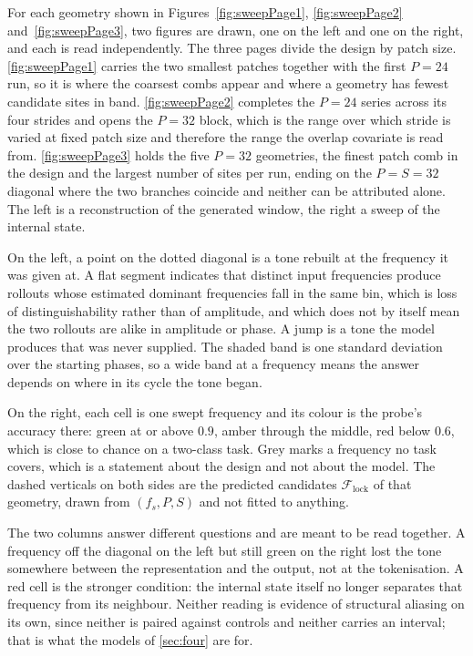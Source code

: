 For each geometry shown in Figures~\ref{fig:sweepPage1}, \ref{fig:sweepPage2} and~\ref{fig:sweepPage3}, two figures are drawn, one on the left and one on the right, and each is read independently. The three pages divide the design by patch size. \autoref{fig:sweepPage1} carries the two smallest patches together with the first $P=24$ run, so it is where the coarsest combs appear and where a geometry has fewest candidate sites in band. \autoref{fig:sweepPage2} completes the $P=24$ series across its four strides and opens the $P=32$ block, which is the range over which stride is varied at fixed patch size and therefore the range the overlap covariate is read from. \autoref{fig:sweepPage3} holds the five $P=32$ geometries, the finest patch comb in the design and the largest number of sites per run, ending on the $P=S=32$ diagonal where the two branches coincide and neither can be attributed alone. The left is a reconstruction of the generated window, the right a sweep of the internal state.

On the left, a point on the dotted diagonal is a tone rebuilt at the frequency it was given at. A flat segment indicates that distinct input frequencies produce rollouts whose estimated dominant frequencies fall in the same bin, which is loss of distinguishability rather than of amplitude, and which does not by itself mean the two rollouts are alike in amplitude or phase. A jump is a tone the model produces that was never supplied. The shaded band is one standard deviation over the starting phases, so a wide band at a frequency means the answer depends on where in its cycle the tone began.

On the right, each cell is one swept frequency and its colour is the probe's accuracy there: green at or above $0.9$, amber through the middle, red below $0.6$, which is close to chance on a two-class task. Grey marks a frequency no task covers, which is a statement about the design and not about the model. The dashed verticals on both sides are the predicted candidates $\mathcal F_{\mathrm{lock}}$ of that geometry, drawn from $(f_s,P,S)$ and not fitted to anything.

The two columns answer different questions and are meant to be read together. A frequency off the diagonal on the left but still green on the right lost the tone somewhere between the representation and the output, not at the tokenisation. A red cell is the stronger condition: the internal state itself no longer separates that frequency from its neighbour. Neither reading is evidence of structural aliasing on its own, since neither is paired against controls and neither carries an interval; that is what the models of \autoref{sec:four} are for.

